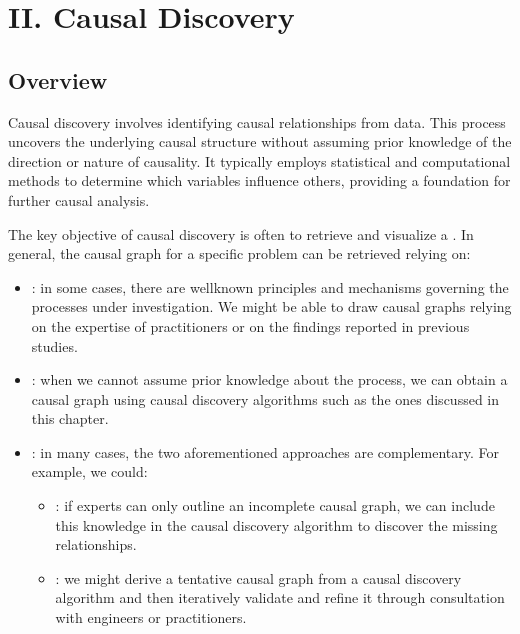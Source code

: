 \documentclass[letterpaper,10pt,english]{jupyterBook}
\begin{document}
\sphinxstepscope


\part{II. Causal Discovery}

\sphinxstepscope


\chapter{Overview}
\label{\detokenize{notebooks/preface_causal_discovery:overview}}\label{\detokenize{notebooks/preface_causal_discovery::doc}}
\sphinxAtStartPar
Causal discovery involves identifying causal relationships from data. This process uncovers the underlying causal structure without assuming prior knowledge of the direction or nature of causality. It typically employs statistical and computational methods to determine which variables influence others, providing a foundation for further causal analysis.

\sphinxAtStartPar
The key objective of causal discovery is often to retrieve and visualize a . In general, the causal graph for a specific problem can be retrieved relying on:
\begin{itemize}
\item {} 
\sphinxAtStartPar
{}: in some cases, there are well\sphinxhyphen{}known principles and mechanisms governing the processes under investigation. We might be able to draw causal graphs relying on the expertise of practitioners or on the findings reported in previous studies.

\item {} 
\sphinxAtStartPar
{}: when we cannot assume prior knowledge about the process, we can obtain a causal graph using causal discovery algorithms such as the ones discussed in this chapter.

\item {} 
\sphinxAtStartPar
{}: in many cases, the two aforementioned approaches are complementary. For example, we could:
\begin{itemize}
\item {} 
\sphinxAtStartPar
{}: if experts can only outline an incomplete causal graph, we can include this knowledge in the causal discovery algorithm to discover the missing relationships.

\item {} 
\sphinxAtStartPar
{}: we might derive a tentative causal graph from a causal discovery algorithm and then iteratively validate and refine it through consultation with engineers or practitioners.

\end{itemize}

\end{itemize}
\end{document}
